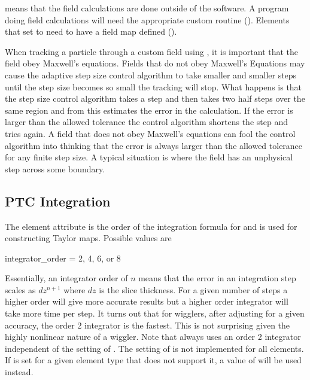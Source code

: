  means that the field calculations are done outside of the \bmad software. A program
doing  field calculations will need the appropriate custom routine ().
Elements that set  to  need to have a field map defined
().

 When tracking a particle through a custom field using , it is
important that the field obey Maxwell's equations. Fields that do not obey Maxwell's Equations may
cause the  adaptive step size control algorithm to take smaller and smaller steps
until the step size becomes so small the tracking will stop. What happens is that the step size
control algorithm takes a step and then takes two half steps over the same region and from this
estimates the error in the calculation. If the error is larger than the allowed tolerance the
control algorithm shortens the step and tries again. A field that does not obey Maxwell's equations
can fool the control algorithm into thinking that the error is always larger than the allowed
tolerance for any finite step size. A typical situation is where the field has an unphysical step
across some boundary.

\subsection{PTC Integration}
\label{s:ptc.integ}

The  element attribute is the order of the integration formula for
 and is used for constructing Taylor maps. Possible values are
\begin{example}
  integrator_order = 2, 4, 6, or 8
\end{example}
Essentially, an integrator order of $n$ means that the error in an integration step scales as
$dz^{n+1}$ where $dz$ is the slice thickness. For a given number of steps a higher order will give
more accurate results but a higher order integrator will take more time per step. It turns out that
for wigglers, after adjusting  for a given accuracy, the order 2 integrator is the
fastest. This is not surprising given the highly nonlinear nature of a wiggler. Note that
 always uses an order 2 integrator independent of the setting of
. The setting of  is not implemented for all elements. If  is set
for a given element type that does not support it, a value of  will be used instead.

